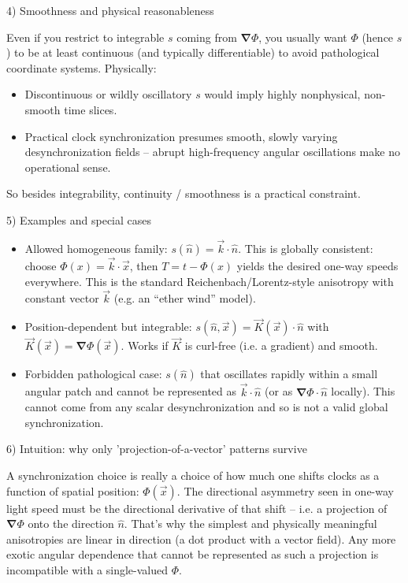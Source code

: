 \documentclass[a4paper]{article}
\theoremstyle{plain}
\theoremstyle{definition}
\newcommand{\vect}[1]{\vec{#1}}
\newcommand{\hatvec}[1]{\hat{#1}}
\newcommand{\del}{\bm{\nabla}}
\begin{document}
4) Smoothness and physical reasonableness

Even if you restrict to integrable $s$ coming from $\del \Phi$, you
usually want $\Phi$ (hence $s$) to be at least continuous (and
typically differentiable) to avoid pathological coordinate systems.
Physically:
\begin{itemize}
\item Discontinuous or wildly oscillatory $s$ would imply highly
  nonphysical, non-smooth time slices.
\item Practical clock synchronization presumes smooth, slowly varying
  desynchronization fields -- abrupt high-frequency angular
  oscillations make no operational sense.
\end{itemize}
So besides integrability, continuity / smoothness is a practical
constraint.

5) Examples and special cases

\begin{itemize}
\item Allowed homogeneous family: $s(\hatvec{n}) = \vect{k} \cdot
  \hatvec{n}$.  This is globally consistent: choose
  $\Phi(x) = \vect{k} \cdot \vect{x}$, then $T = t - \Phi(x)$ yields
  the desired one-way speeds everywhere.  This is the standard
  Reichenbach/Lorentz-style anisotropy with constant vector $\vect{k}$
  (e.g. an ``ether wind'' model).
\item Position-dependent but integrable:
  $s(\hatvec{n}, \vect{x}) = \vect{K}(\vect{x}) \cdot \hatvec{n}$
  with $\vect{K}(\vect{x}) = \del \Phi(\vect{x})$.  Works if
  $\vect{K}$ is curl-free (i.e. a gradient) and smooth.
\item Forbidden pathological case: $s(\hatvec{n})$ that oscillates
  rapidly within a small angular patch and cannot be represented as
  $\vect{k} \cdot \hatvec{n}$ (or as $\del \Phi \cdot \hatvec{n}$
  locally).  This cannot come from any scalar desynchronization and so
  is not a valid global synchronization.
\end{itemize}

6) Intuition: why only 'projection-of-a-vector' patterns survive

A synchronization choice is really a choice of how much one shifts
clocks as a function of spatial position: $\Phi(\vect{x})$.  The
directional asymmetry seen in one-way light speed must be the
directional derivative of that shift -- i.e. a projection of $\del
\Phi$ onto the direction $\hatvec{n}$.  That's why the simplest and
physically meaningful anisotropies are linear in direction (a dot
product with a vector field). Any more exotic angular dependence that
cannot be represented as such a projection is incompatible with a
single-valued $\Phi$.
\end{document}
